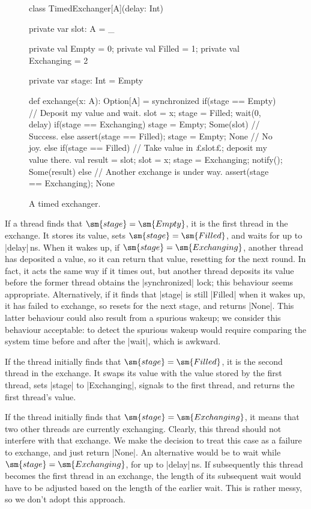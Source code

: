 
\begin{figure}
\begin{scala}
class TimedExchanger[A](delay: Int){
  private var slot: A = _

  private val Empty = 0; private val Filled = 1; private val Exchanging = 2

  private var stage: Int = Empty

  def exchange(x: A): Option[A] = synchronized{
    if(stage == Empty){
      // Deposit my value and wait.
      slot = x; stage = Filled; wait(0, delay)
      if(stage == Exchanging){ stage = Empty; Some(slot) } // Success.
      else{ assert(stage == Filled); stage = Empty; None } // No joy.
    }
    else if(stage == Filled){  // Take value in £slot£; deposit my value there.
      val result = slot; slot = x; stage = Exchanging; notify(); Some(result)
    }
    else{ // Another exchange is under way.
      assert(stage == Exchanging); None 
    } 
  }
}
\end{scala}
\caption{A timed exchanger.}
\label{fig:TimeoutExchanger}
\end{figure}


If a thread finds that $\sm{stage} = \sm{Empty}$, it is the first thread in
the exchange.  It stores its value, sets $\sm{stage} = \sm{Filled}$, and waits
for up to |delay|\,ns.  When it wakes up, if $\sm{stage} = \sm{Exchanging}$,
another thread has deposited a value, so it can return that value, resetting
for the next round.  In fact, it acts the same way if it times out, but
another thread deposits its value before the former thread obtains the
|synchronized| lock; this behaviour seems appropriate.  Alternatively, if it
finds that |stage| is still |Filled| when it wakes up, it has failed to
exchange, so resets for the next stage, and returns |None|.  This latter
behaviour could also result from a spurious wakeup; we consider this behaviour
acceptable: to detect the spurious wakeup would require comparing the system
time before and after the |wait|, which is awkward.

If the thread initially finds that $\sm{stage} = \sm{Filled}$, it is the
second thread in the exchange.  It swaps its value with the value stored by
the first thread, sets |stage| to |Exchanging|, signals to the first thread,
and returns the first thread's value. 

If the thread initially finds that $\sm{stage} = \sm{Exchanging}$, it means
that two other threads are currently exchanging.  Clearly, this thread should
not interfere with that exchange.  We make the decision to treat this case as
a failure to exchange, and just return |None|.  An alternative would be to
wait while $\sm{stage} = \sm{Exchanging}$, for up to |delay|\,ns.  If
subsequently this thread becomes the first thread in an exchange, the length
of its subsequent wait would have to be adjusted based on the length of the
earlier wait.  This is rather messy, so we don't adopt this approach. 

